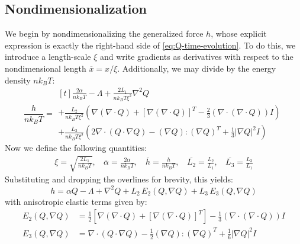 \documentclass[reqno]{article}
\begin{document}
  \subsection{Nondimensionalization} \label{nondimensionalization}
  We begin by nondimensionalizing the generalized force $h$, whose explicit
  expression is exactly the right-hand side of \eqref{eq:Q-time-evolution}.
  To do this, we introduce a length-scale $\xi$ and write gradients as
  derivatives with respect to the nondimensional length $\overline{x} = x /
  \xi$.
  Additionally, we may divide by the energy density $n k_B T$:
  \begin{equation}
    \frac{h}{n k_B T}
    =
    \begin{multlined}[t]
      \frac{2 \alpha}{n k_B T}
      - \Lambda
      + \frac{2 L_1}{n k_B T \xi^2} \nabla^2 Q  \\
      + \frac{L_2}{n k_B T \xi^2} \left(
        \nabla \left( \nabla \cdot Q \right)
        + \left[ \nabla \left( \nabla \cdot Q \right) \right]^T
        - \tfrac23 \left( \nabla \cdot \left( \nabla \cdot Q \right) \right) I
      \right) \\
      + \frac{L_3}{n k_B T \xi^2} \left(
        2 \nabla \cdot \left( Q \cdot \nabla Q \right)
        - \left( \nabla Q \right) : \left( \nabla Q \right)^T
        + \tfrac13 \left| \nabla Q \right|^2 I
      \right)
    \end{multlined}
  \end{equation}
  Now we define the following quantities:
  \begin{equation}
    \begin{split}
      \xi = \sqrt{\frac{2 L_1}{n k_B T}}, \:\:\:\:
      \overline{\alpha} = \frac{2 \alpha}{n k_B T}, \:\:\:\:
      \overline{h} = \frac{h}{n k_B T}, \:\:\:\:
      \overline{L_2} = \frac{L_2}{L_1}, \:\:\:\:
      \overline{L_3} = \frac{L_3}{L_1}
    \end{split}
  \end{equation}
  Substituting and dropping the overlines for brevity, this yields:
  \begin{equation}
    h
    =
    \alpha Q
    - \Lambda
    + \nabla^2 Q 
    + L_2 \, E_2 (Q, \nabla Q) 
    + L_3 \, E_3 (Q, \nabla Q)
  \end{equation}
  with anisotropic elastic terms given by:
  \begin{align}
    E_2 (Q, \nabla Q)
    &=
    \tfrac12 \left[
    \nabla \left( \nabla \cdot Q \right)
    + \left[ \nabla \left( \nabla \cdot Q \right) \right]^T
    \right]
    - \tfrac13 \left( \nabla \cdot \left( \nabla \cdot Q \right) \right) I \\
    E_3(Q, \nabla Q)
    &=
    \nabla \cdot \left( Q \cdot \nabla Q \right)
    - \tfrac12 \left( \nabla Q \right) :  \left( \nabla Q \right)^T
    + \tfrac16 \left| \nabla Q \right|^2 I
  \end{align}
\end{document}
